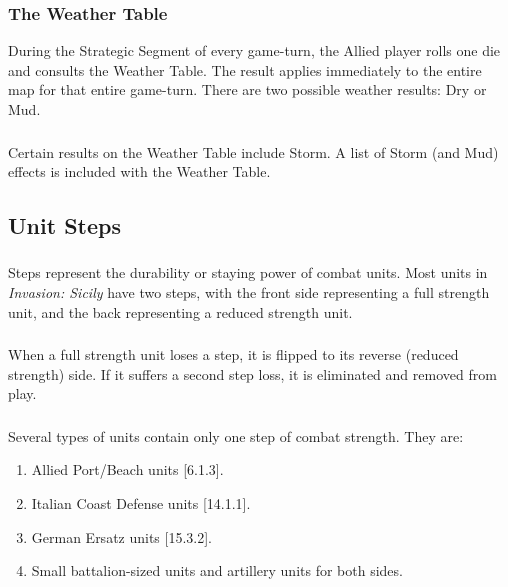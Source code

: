 \subsubsection{The Weather Table}
During the Strategic Segment of every game-turn, the Allied player rolls one die and consults the Weather Table. The result applies immediately to the entire map for that entire game-turn. There are two possible weather results: Dry or Mud.

\subsubsection{}
Certain results on the Weather Table include Storm. A list of Storm (and Mud) effects is included with the Weather Table.

\subsection{Unit Steps}
\subsubsection{}
Steps represent the durability or staying power of combat units. Most units in \textit{Invasion: Sicily} have two steps, with the front side representing a full strength unit, and the back representing a reduced strength unit.
\subsubsection{}
When a full strength unit loses a step, it is flipped to its reverse (reduced strength) side. If it suffers a second step loss, it is eliminated and removed from play.
\subsubsection{}
Several types of units contain only one step of combat strength. They are:
\begin{enumerate}[label=\alph*.]
  \item Allied Port/Beach units [6.1.3].
  \item Italian Coast Defense units [14.1.1].
  \item German Ersatz units [15.3.2].
  \item Small battalion-sized units and artillery units for both sides.
\end{enumerate}

